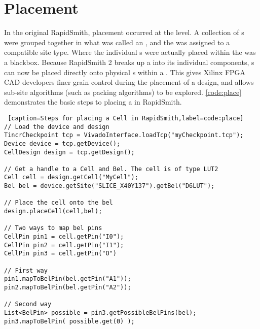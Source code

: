 \newpage
\section{Placement} \label{sec:placement}

In the original RapidSmith, placement occurred at the  level. A
collection of s were grouped together in what was called an
, and the  was assigned to a compatible site type.
Where the individual s were actually placed within the 
was a blackbox. Because RapidSmith 2 breaks up a  into its
individual components, s can now be placed directly onto
physical s within a . This gives Xilinx FPGA CAD developers
finer grain control during the placement of a design, and allows sub-site
algorithms (such as packing algorithms) to be explored. \autoref{code:place}
demonstrates the basic steps to placing a  in RapidSmith.

\begin{lstlisting} [caption=Steps for placing a Cell in RapidSmith,label=code:place]
// Load the device and design
TincrCheckpoint tcp = VivadoInterface.loadTcp("myCheckpoint.tcp"); 
Device device = tcp.getDevice();
CellDesign design = tcp.getDesign();

// Get a handle to a Cell and Bel. The cell is of type LUT2 
Cell cell = design.getCell("MyCell"); 
Bel bel = device.getSite("SLICE_X40Y137").getBel("D6LUT");

// Place the cell onto the bel
design.placeCell(cell,bel);

// Two ways to map bel pins
CellPin pin1 = cell.getPin("I0");
CellPin pin2 = cell.getPin("I1");
CellPin pin3 = cell.getPin("O")

// First way
pin1.mapToBelPin(bel.getPin("A1"));
pin2.mapToBelPin(bel.getPin("A2"));

// Second way
List<BelPin> possible = pin3.getPossibleBelPins(bel);
pin3.mapToBelPin( possible.get(0) );
\end{lstlisting}

